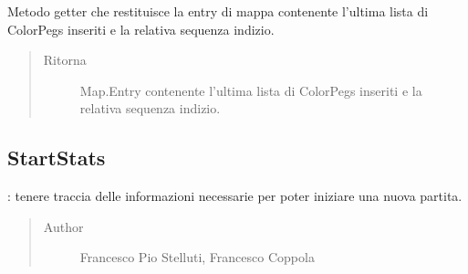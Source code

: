 \documentclass[letterpaper,10pt,italian]{sphinxmanual}
\begin{document}
\begin{fulllineitems}
\label{\detokenize{source/it/unicam/cs/pa/mastermind/ui/InteractionView:it.unicam.cs.pa.mastermind.ui.InteractionView.getLastAttemptAndClue()}}
Metodo getter che restituisce la entry di mappa contenente l’ultima lista di ColorPegs inseriti e la relativa sequenza indizio.
\begin{quote}\begin{description}
\item[{Ritorna}] \leavevmode
Map.Entry contenente l’ultima lista di ColorPegs inseriti e la relativa sequenza indizio.

\end{description}\end{quote}

\end{fulllineitems}



\subsection{StartStats}
\label{\detokenize{source/it/unicam/cs/pa/mastermind/ui/StartStats:startstats}}\label{\detokenize{source/it/unicam/cs/pa/mastermind/ui/StartStats::doc}}

\begin{fulllineitems}
\label{\detokenize{source/it/unicam/cs/pa/mastermind/ui/StartStats:it.unicam.cs.pa.mastermind.ui.StartStats}}
: tenere traccia delle informazioni necessarie per poter iniziare una nuova partita.
\begin{quote}\begin{description}
\item[{Author}] \leavevmode
Francesco Pio Stelluti, Francesco Coppola

\end{description}\end{quote}

\end{fulllineitems}
\end{document}
